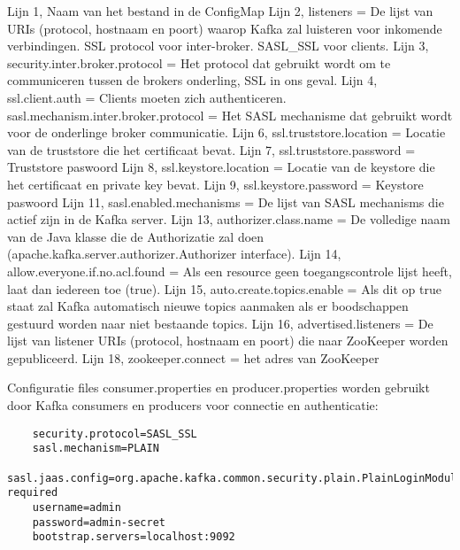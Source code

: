 Lijn 1, Naam van het bestand in de ConfigMap 
\newline
Lijn 2, listeners = De lijst van URIs (protocol, hostnaam en poort) waarop Kafka zal luisteren voor inkomende verbindingen. SSL protocol voor inter-broker. SASL\_SSL voor clients.
\newline
Lijn 3, security.inter.broker.protocol = Het protocol dat gebruikt wordt om te communiceren tussen de brokers onderling, SSL in ons geval.
\newline
Lijn 4, ssl.client.auth = Clients moeten zich authenticeren. \newline
sasl.mechanism.inter.broker.protocol = Het SASL mechanisme dat gebruikt wordt voor de onderlinge broker communicatie.
\newline
Lijn 6, ssl.truststore.location = Locatie van de truststore die het certificaat bevat.
\newline
Lijn 7, ssl.truststore.password = Truststore paswoord
\newline
Lijn 8, ssl.keystore.location = Locatie van de keystore die het certificaat en private key bevat.
\newline
Lijn 9, ssl.keystore.password = Keystore paswoord
\newline
Lijn 11, sasl.enabled.mechanisms = De lijst van SASL mechanisms die actief zijn in de Kafka server.
\newline
Lijn 13, authorizer.class.name = De volledige naam van de Java klasse die de Authorizatie zal doen (apache.kafka.server.authorizer.Authorizer interface).
\newline
Lijn 14, allow.everyone.if.no.acl.found = Als een resource geen toegangscontrole lijst heeft, laat dan iedereen toe (true).
\newline
Lijn 15, auto.create.topics.enable = Als dit op true staat zal Kafka automatisch nieuwe topics aanmaken als er boodschappen gestuurd worden naar niet bestaande topics. 
\newline
Lijn 16, advertised.listeners = De lijst van listener URIs (protocol, hostnaam en poort) die naar ZooKeeper worden gepubliceerd.
\newline
Lijn 18, zookeeper.connect = het adres van ZooKeeper
\newline

Configuratie files consumer.properties en producer.properties worden gebruikt door Kafka consumers en producers voor connectie en authenticatie:
\begin{lstlisting}
    security.protocol=SASL_SSL
    sasl.mechanism=PLAIN
    sasl.jaas.config=org.apache.kafka.common.security.plain.PlainLoginModule required
    username=admin
    password=admin-secret
    bootstrap.servers=localhost:9092
\end{lstlisting}

